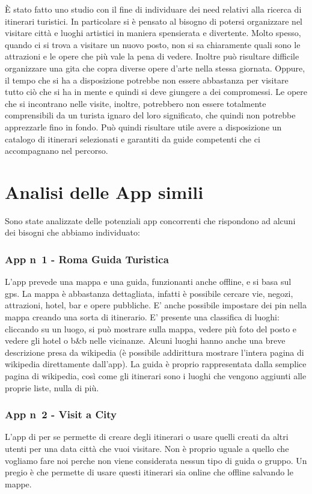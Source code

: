 

È stato fatto uno studio con il fine di individuare dei need relativi alla ricerca
di itinerari turistici. In particolare si è pensato al bisogno di potersi organizzare nel visitare città e
luoghi artistici in maniera spensierata e divertente. Molto spesso, quando ci si trova a 
visitare un nuovo posto, non si sa chiaramente quali sono le attrazioni e le opere che più
vale la pena di vedere. Inoltre può risultare difficile organizzare una gita che copra
diverse opere d'arte nella stessa giornata. Oppure, il tempo che si ha a disposizione potrebbe non
essere abbastanza per visitare tutto ciò che si ha in mente e quindi si deve giungere a dei compromessi.
Le opere che si incontrano nelle visite, inoltre, potrebbero non essere totalmente comprensibili
da un turista ignaro del loro significato, che quindi non potrebbe apprezzarle fino in fondo.
Può quindi risultare utile avere a disposizione un catalogo di itinerari selezionati e
garantiti da guide competenti che ci accompagnano nel percorso.

\clearpage

\section{Analisi delle App simili}

Sono state analizzate delle potenziali app concorrenti che rispondono ad alcuni dei bisogni
che abbiamo individuato:

\subsubsection*{App n\degree \ 1 - Roma Guida Turistica}
L'app prevede una mappa e una guida, funzionanti anche offline, e si basa sul gps.
La mappa è abbastanza dettagliata, infatti è possibile cercare vie,
negozi, attrazioni, hotel, bar e opere pubbliche.
E’ anche possibile impostare dei pin nella mappa creando una sorta di itinerario.
E’ presente una classifica di luoghi: cliccando su un luogo, si può mostrare sulla mappa,
vedere più foto del posto e vedere gli hotel o b\&b nelle vicinanze.
Alcuni luoghi hanno anche una breve descrizione presa da wikipedia
(è possibile addirittura mostrare l’intera pagina di wikipedia direttamente dall’app).
La guida è proprio rappresentata dalla semplice pagina di wikipedia, 
così come gli itinerari sono i luoghi che vengono aggiunti alle proprie liste, nulla di più.

\subsubsection*{App n\degree \ 2 - Visit a City}
L'app di per se permette di creare degli itinerari o usare quelli creati da altri utenti per una data città che vuoi visitare. Non è proprio uguale a quello che vogliamo fare noi perche non viene considerata nessun tipo di guida o gruppo.
Un pregio è che permette di usare questi itinerari sia online che offline salvando le mappe.

